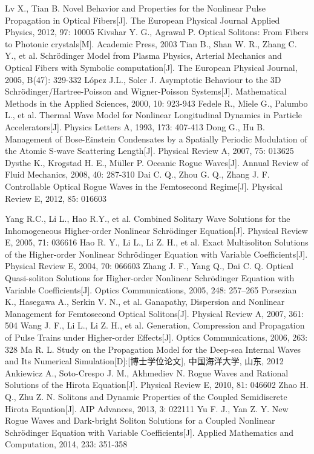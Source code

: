 \begin{thebibliography}{0}
 Lv X., Tian B. Novel Behavior and Properties for the Nonlinear Pulse Propagation in Optical Fibers[J]. The  European  Physical  Journal  Applied  Physics, 2012, 97: 10005
 Kivshar Y. G., Agrawal P. Optical Solitons: From Fibers to Photonic crystals[M]. Academic Press, 2003
 Tian B., Shan W. R., Zhang C. Y., et al. Schr\"{o}dinger Model from Plasma Physics, Arterial Mechanics and Optical Fibers with Symbolic computation[J]. The European Physical Journal, 2005, B(47): 329-332
 L\'{o}pez J.L., Soler J. Asymptotic Behaviour to the 3D Schr\"{o}dinger/Hartree-Poisson and Wigner-Poisson Systems[J]. Mathematical Methods in the Applied Sciences, 2000, 10: 923-943
 Fedele R., Miele G., Palumbo L., et al. Thermal Wave Model for Nonlinear Longitudinal Dynamics in Particle Accelerators[J]. Physics Letters A, 1993, 173: 407-413
 Dong G., Hu B. Management of Bose-Einstein Condensates by a Spatially Periodic Modulation of the Atomic S-wave Scattering Length[J]. Physical Review A,  2007, 75: 013625
 Dysthe K., Krogstad H. E., M\"{u}ller P. Oceanic Rogue Waves[J]. Annual Review of Fluid Mechanics, 2008, 40: 287-310
 Dai C. Q., Zhou G. Q., Zhang J. F. Controllable Optical Rogue Waves in the Femtosecond Regime[J]. Physical Review E, 2012, 85: 016603


 Yang R.C., Li L., Hao R.Y., et al. Combined Solitary Wave Solutions for the Inhomogeneous Higher-order Nonlinear Schr\"{o}dinger Equation[J]. Physical Review E, 2005, 71: 036616
 Hao R. Y., Li L., Li Z. H., et al. Exact Multisoliton Solutions of the Higher-order Nonlinear Schr\"{o}dinger Equation with Variable Coefficients[J]. Physical Review E, 2004, 70: 066603
 Zhang J. F., Yang Q., Dai C. Q. Optical Quasi-soliton Solutions for Higher-order Nonlinear Schr\"{o}dinger Equation with Variable Coefficients[J]. Optics Communications, 2005, 248: 257–265
 Porsezian K., Hasegawa A., Serkin V. N., et al. Ganapathy, Dispersion and Nonlinear Management for Femtosecond Optical Solitons[J]. Physical Review A, 2007, 361: 504
 Wang J. F., Li L., Li Z. H., et al. Generation, Compression and Propagation of Pulse Trains under Higher-order Effects[J]. Optics Communications, 2006, 263: 328
 Ma R. L. Study on the Propagation Model for the Deep-sea Internal Waves and Its Numerical Simulation[D]:[博士学位论文], 中国海洋大学, 山东, 2012
 Ankiewicz A., Soto-Crespo J. M., Akhmediev N. Rogue Waves and Rational Solutions of the Hirota Equation[J]. Physical Review E, 2010, 81: 046602
 Zhao H. Q., Zhu Z. N. Solitons and Dynamic Properties of the Coupled Semidiscrete Hirota Equation[J]. AIP Advances, 2013, 3: 022111
 Yu F. J., Yan Z. Y. New Rogue Waves and Dark-bright Soliton Solutions for a Coupled Nonlinear Schr\"{o}dinger Equation with Variable Coefficients[J]. Applied Mathematics and Computation, 2014, 233: 351-358



\end{thebibliography}
